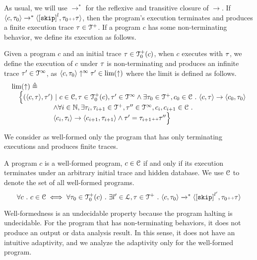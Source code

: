  As usual, we will use $\to^*$ for the reflexive and transitive closure of $\to$. 
 If $\config{c, \trace_0} \rightarrow^{*} \config{\clabel{\eskip}^l, \trace_0 \tracecat \trace}$,
 then the program's execution terminates and produces a finite execution trace $\mathtt{\tau} \in \mathcal{T}^{+}$. 
If a program $c$ has some non-terminating behavior, we define its execution as follows.
\\
\begin{defn}
 \label{def:adaptfun-non-terminating}
 Given a program $c$ and an initial trace $\mathtt{\tau} \in \mathcal{T}^{+}_0(c)$,
 when $c$ executes with $\mathtt{\tau}$, we define the execution of $c$ under $\mathtt{\tau}$ is non-terminating and produces an infinite trace $\mathtt{\tau}' \in \mathcal{T}^{\infty}$, as 
 $\langle c, \mathtt{\tau}_0 \rangle \uparrow^{\infty} \mathtt{\tau}' \in \lim(\uparrow)$
 where the limit is defined as follows.
 \[
 \begin{array}{l}
 \lim(\uparrow) 
 \triangleq 
 \\ \quad
 \Big\{
 (\langle c, \mathtt{\tau} \rangle, \mathtt{\tau}') ~\vert~ 
 c\in \mathcal{C}, \mathtt{\tau} \in \mathcal{T}^{+}_0(c),
 \mathtt{\tau}' \in \mathcal{T}^{\infty}
 \land \exists \mathtt{\tau}_0 \in \mathcal{T}^{+}, c_0 \in \mathcal{C} ~.~ 
 \langle c, \mathtt{\tau} \rangle \to \langle c_0, \mathtt{\tau}_0 \rangle
 \\ \qquad \qquad \qquad 
 \land \forall i \in \mathbb{N}, \exists \mathtt{\tau}_i, \mathtt{\tau}_{i + 1} \in \mathcal{T}^{+}, \mathtt{\tau}'' \in \mathcal{T}^{\infty}, c_i, c_{i + 1} \in \mathcal{C} ~.~ 
 \\ \qquad \qquad \qquad 
 \langle c_i, \mathtt{\tau}_i \rangle \to \langle c_{i + 1}, \mathtt{\tau}_{i + 1} \rangle 
 \land \mathtt{\tau}' = \mathtt{\tau}_{i + 1} {\scriptscriptstyle ++} \mathtt{\tau}''
 \Big\}
 \end{array}
 \]
\end{defn}
We consider as well-formed only the program that has only terminating executions and produces finite traces. 
\begin{defn}
 \label{def:adaptfun-wfprog} 
 A program $c$ is a well-formed program, $c \in \mathcal{C}$ if and only if
 its execution terminates
 under an arbitrary initial trace and hidden database. We use $\mathcal{C}$ to denote the set of all well-formed programs.
 \[
 \forall c \st c \in \cdom \iff 
 \forall \trace_0 \in \ftdom_0(c) \st \exists l' \in \ldom, \trace \in \ftdom
 \st \config{c, \trace_0} \xrightarrow{}^* \config{\clabel{\eskip}^{l'}, \trace_0 \tracecat \trace}
 \]
\end{defn}
Well-formedness is an undecidable property because the program halting is undecidable.
For the program that has non-terminating behaviors, it does not produce an output or data analysis result.
In this sense, it does not have an intuitive adaptivity, and we analyze the adaptivity only for the well-formed program.
 

